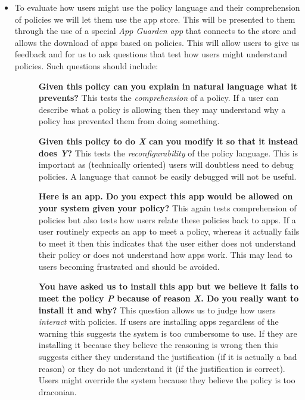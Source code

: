 \documentclass[a4paper,sfsidenotes]{%
  scrartcl%
}
\begin{document}
\newcommand{\descitem}[1]{\item[]\textbf{\sffamily #1}}
\begin{itemize}
  \item To evaluate how users might use the policy language and their
    comprehension of policies we will let them use the app store.  This will be
    presented to them through the use of a special \emph{App Guarden app} that
    connects to the store and allows the download of apps based on policies.
    This will allow users to give us feedback and for us to ask questions that
    test how users might understand policies.  Such questions should include:

    \begin{description}
      \descitem{Given this policy can you explain in natural language what it
        prevents? }  This tests the \emph{comprehension} of a policy.  If a user
        can describe what a policy is allowing then they may understand why a
        policy has prevented them from doing something.

      \descitem{Given this policy to do \emph{X} can you modify it so that it
        instead does \emph{Y}? }  This tests the \emph{reconfigurability} of 
        the policy language.  This is important as (technically oriented) users
        will doubtless need to debug policies.  A language that cannot be easily
        debugged will not be useful.

      \descitem{Here is an app.  Do you expect this app would be allowed on your
        system given your policy? } This again tests comprehension of policies
        but also tests how users relate these policies back to apps.  If a user
        routinely expects an app to meet a policy, whereas it actually fails to
        meet it then this indicates that the user either does not understand
        their policy or does not understand how apps work.  This may lead to
        users becoming frustrated and should be avoided.

      \descitem{You have asked us to install this app but we believe it fails to
          meet the policy \emph{P} because of reason \emph{X}. Do you really want
        to install it and why? }  This question allows us to judge how users
      \emph{interact} with policies.  If users are installing apps regardless of
      the warning this suggests the system is too cumbersome to use.  If they
      are installing it because they believe the reasoning is wrong then this
      suggests either they understand the justification (if it is
      actually a bad reason) or they do not understand it (if the justification
      is correct).  Users might override the system because they believe the
      policy is too draconian.
  

\end{description}
\end{itemize}
\end{document}
